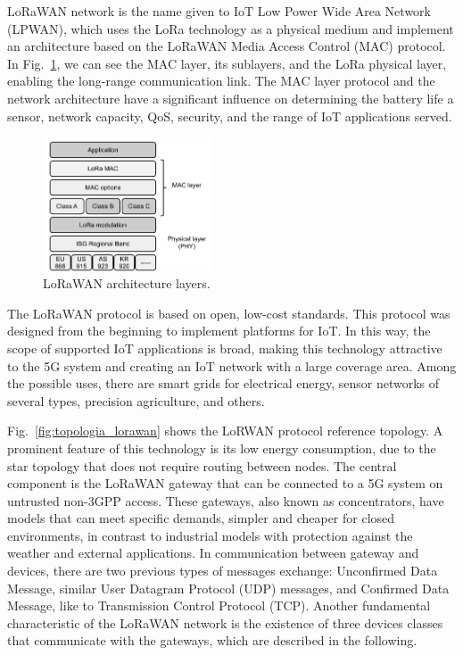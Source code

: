 LoRaWAN network is the name given to IoT Low Power Wide Area Network (LPWAN), which uses the LoRa technology as a physical medium and implement an architecture based on the LoRaWAN Media Access Control (MAC) protocol. In Fig.~\ref{fig:mac_lorawan}, we can see the MAC layer, its sublayers, and the LoRa physical layer, enabling the long-range communication link.  The MAC layer protocol and the network architecture have a significant influence on determining the battery life a sensor, network capacity, QoS, security, and the range of IoT applications served.


\begin{figure}[!h]
 \begin{center}
\includegraphics[width=0.45\textwidth]{figs/mac_lorawan-2.pdf}
  \end{center}
\caption{LoRaWAN architecture layers.}
\label{fig:mac_lorawan}
\end{figure}

The LoRaWAN protocol is based on open, low-cost standards. This protocol was designed from the beginning to implement platforms for IoT. In this way, the scope of supported IoT applications is broad, making this technology attractive to the 5G system and creating an IoT network with a large coverage area. Among the possible uses, there are smart grids for electrical energy, sensor networks of several types, precision agriculture, and others.


Fig.~\ref{fig:topologia_lorawan} shows the LoRWAN protocol reference topology. A prominent feature of this technology is its low energy consumption, due to the star topology that does not require routing between nodes. The central component is the LoRaWAN gateway that can be connected to a 5G system on untrusted non-3GPP access. These gateways, also known as concentrators, have models that can meet specific demands, simpler and cheaper for closed environments, in contrast to industrial models with protection against the weather and external applications. In communication between gateway and devices, there are two previous types of messages exchange: Unconfirmed Data Message, similar User Datagram Protocol (UDP) messages, and Confirmed Data Message, like to Transmission Control Protocol (TCP). Another fundamental characteristic of the LoRaWAN network is the existence of three devices classes that communicate with the gateways, which are described in the following.

